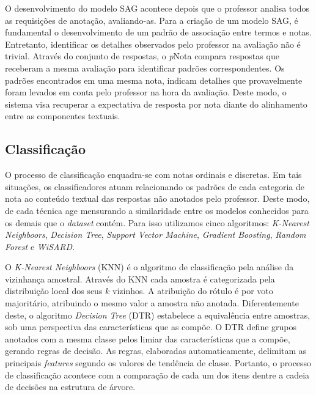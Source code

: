 O desenvolvimento do modelo SAG acontece depois que o professor analisa todos as requisições de anotação, avaliando-as. Para a criação de um modelo SAG, é fundamental o desenvolvimento de um padrão de associação entre termos e notas. Entretanto, identificar os detalhes observados pelo professor na avaliação não é trivial. Através do conjunto de respostas, o \textit{p}Nota compara respostas que receberam a mesma avaliação para identificar padrões correspondentes. Os padrões encontrados em uma mesma nota, indicam detalhes que provavelmente foram levados em conta pelo professor na hora da avaliação. Deste modo, o sistema visa recuperar a expectativa de resposta por nota diante do alinhamento entre as componentes textuais.

\subsection{Classificação}
\label{subsec-classificacao}

O processo de classificação enquadra-se com notas ordinais e discretas. Em tais situações, os classificadores atuam relacionando os padrões de cada categoria de nota ao conteúdo textual das respostas não anotados pelo professor. Deste modo, de cada técnica age mensurando a similaridade entre os modelos conhecidos para os demais que o \textit{dataset} contém. Para isso utilizamos cinco algoritmos: \textit{K-Nearest Neighboors}, \textit{Decision Tree}, \textit{Support Vector Machine}, \textit{Gradient Boosting}, \textit{Random Forest} e \textit{WiSARD}.

O \textit{K-Nearest Neighboors} (KNN) é o algoritmo de classificação pela análise da vizinhança amostral. Através do KNN cada amostra é categorizada pela distribuição local dos seus $ k $ vizinhos. A atribuição do rótulo é por voto majoritário, atribuindo o mesmo valor a amostra não anotada. Diferentemente deste, o algoritmo \textit{Decision Tree} (DTR) estabelece a equivalência entre amostras, sob uma perspectiva das características que as compõe. O DTR define grupos anotados com a mesma classe pelos limiar das características que a compõe, gerando regras de decisão. As regras, elaboradas automaticamente, delimitam as principais \textit{features} segundo os valores de tendência de classe. Portanto, o processo de classificação acontece com a comparação de cada um dos itens dentre a cadeia de decisões na estrutura de árvore.

